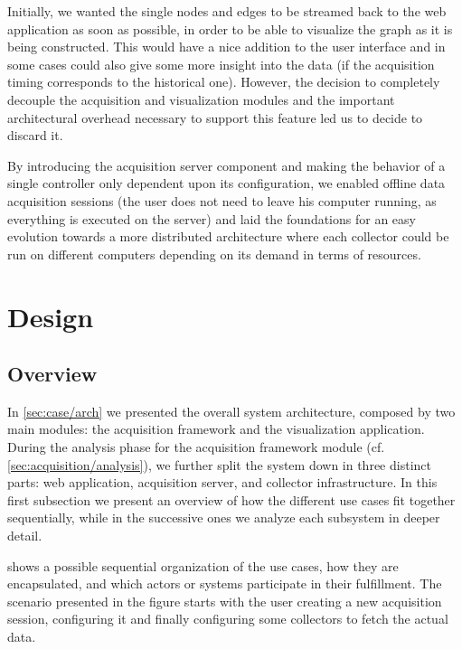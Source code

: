 Initially, we wanted the single nodes and edges to be streamed back to the web application as soon as possible, in order to be able to visualize the graph as it is being constructed. This would have a nice addition to the user interface and in some cases could also give some more insight into the data (if the acquisition timing corresponds to the historical one). However, the decision to completely decouple the acquisition and visualization modules and the important architectural overhead necessary to support this feature led us to decide to discard it.

By introducing the acquisition server component and making the behavior of a single controller only dependent upon its configuration, we enabled offline data acquisition sessions (the user does not need to leave his computer running, as everything is executed on the server) and laid the foundations for an easy evolution towards a more distributed architecture where each collector could be run on different computers depending on its demand in terms of resources.


\section{Design}
\label{sec:acquisition/design}


\subsection{Overview}

In \vref{sec:case/arch} we presented the overall system architecture, composed by two main modules: the acquisition framework and the visualization application. During the analysis phase for the acquisition framework module (cf. \ref{sec:acquisition/analysis}), we further split the system down in three distinct parts: web application, acquisition server, and collector infrastructure. In this first subsection we present an overview of how the different use cases fit together sequentially, while in the successive ones we analyze each subsystem in deeper detail.

 shows a possible sequential organization of the use cases, how they are encapsulated, and which actors or systems participate in their fulfillment. The scenario presented in the figure starts with the user creating a new acquisition session, configuring it and finally configuring some collectors to fetch the actual data.

